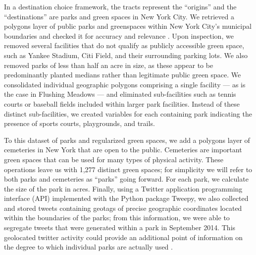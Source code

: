 \documentclass[Afour,sageh.bst]{sagej}
\begin{document}
In a destination choice framework, the tracts represent the ``origins''
and the ``destinations'' are parks and green spaces in New York City. We
retrieved a polygons layer of public parks and greenspaces within New
York City's municipal boundaries and checked it for accuracy and
relevance \citep{nycparks}. Upon inspection, we removed several
facilities that do not qualify as publicly accessible green space, such
as Yankee Stadium, Citi Field, and their surrounding parking lots. We
also removed parks of less than half an acre in size, as these appear to
be predominantly planted medians rather than legitimate public green
space. We consolidated individual geographic polygons comprising a
single facility --- as is the case in Flushing Meadows --- and
eliminated sub-facilities such as tennis courts or baseball fields
included within larger park facilities. Instead of these distinct
sub-facilities, we created variables for each containing park indicating
the presence of sports courts, playgrounds, and trails.

To this dataset of parks and regularized green spaces, we add a polygons
layer of cemeteries in New York that are open to the public. Cemeteries
are important green spaces that can be used for many types of physical
activity. These operations leave us with 1,277 distinct green spaces;
for simplicity we will refer to both parks and cemeteries as ``parks''
going forward. For each park, we calculate the size of the park in
acres. Finally, using a Twitter application programming interface (API)
implemented with the Python package Tweepy, we also collected and stored
tweets containing geotags of precise geographic coordinates located
within the boundaries of the parks; from this information, we were able
to segregate tweets that were generated within a park in September 2014.
This geolocated twitter activity could provide an additional point of
information on the degree to which individual parks are actually used
\citep{Wang2016}.
\end{document}
